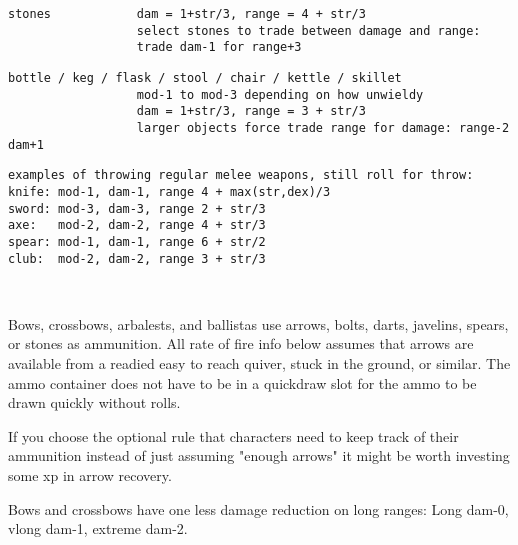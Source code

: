 \begin{samepage}
\begin{verbatim}
stones            dam = 1+str/3, range = 4 + str/3
                  select stones to trade between damage and range:
                  trade dam-1 for range+3
\end{verbatim} \blocklistgap \begin{verbatim}
bottle / keg / flask / stool / chair / kettle / skillet
                  mod-1 to mod-3 depending on how unwieldy
                  dam = 1+str/3, range = 3 + str/3
                  larger objects force trade range for damage: range-2 dam+1
\end{verbatim} \blocklistgap \begin{verbatim}
examples of throwing regular melee weapons, still roll for throw:
knife: mod-1, dam-1, range 4 + max(str,dex)/3
sword: mod-3, dam-3, range 2 + str/3
axe:   mod-2, dam-2, range 4 + str/3
spear: mod-1, dam-1, range 6 + str/2
club:  mod-2, dam-2, range 3 + str/3
\end{verbatim} \end{samepage} \normalsize \goodbreak

\


\noindent Bows, crossbows, arbalests, and ballistas use arrows, bolts, darts, javelins, spears, or stones as ammunition. All rate of fire info below assumes that arrows are available from a readied easy to reach quiver, stuck in the ground, or similar. The ammo container does not have to be in a quickdraw slot for the ammo to be drawn quickly without rolls.

If you choose the optional rule that characters need to keep track of their ammunition instead of just assuming "enough arrows" it might be worth investing some xp in arrow recovery.

Bows and crossbows have one less damage reduction on long ranges: Long dam-0, vlong dam-1, extreme dam-2.

\

